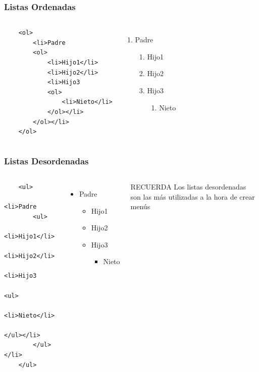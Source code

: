 \documentclass{beamer}
\begin{document}
\begin{frame}[fragile]
\frametitle{Listas Ordenadas}
	\begin{columns}[c]
	\begin{verbatim}
	<ol>
	    <li>Padre
	    <ol>
	        <li>Hijo1</li>
	        <li>Hijo2</li>
	        <li>Hijo3
	        <ol>
	            <li>Nieto</li>
	        </ol></li>
	    </ol></li>
	</ol>
	\end{verbatim}
	\begin{enumerate}
	\item Padre
		\begin{enumerate}
		\item Hijo1
		\item Hijo2
		\item Hijo3
			\begin{enumerate}
			\item Nieto
			\end{enumerate}
		\end{enumerate}
	\end{enumerate}
	\end{columns}
\end{frame}

\begin{frame}[fragile]
\frametitle{Listas Desordenadas}
	\begin{columns}[c]
	\begin{verbatim}
	<ul>
	    <li>Padre
	    <ul>
	        <li>Hijo1</li>
	        <li>Hijo2</li>
	        <li>Hijo3
	        <ul>
	            <li>Nieto</li>
	        </ul></li>
	    </ul></li>
	</ul>
	\end{verbatim}
	\begin{itemize}
	\item Padre
		\begin{itemize}
		\item Hijo1
		\item Hijo2
		\item Hijo3
			\begin{itemize}
			\item Nieto
			\end{itemize}
		\end{itemize}
	\end{itemize}
	\begin{exampleblock}{RECUERDA}
	Los listas desordenadas son las más utilizadas a la hora de crear menús
	\end{exampleblock}
	\end{columns}
\end{frame}
\end{document}
